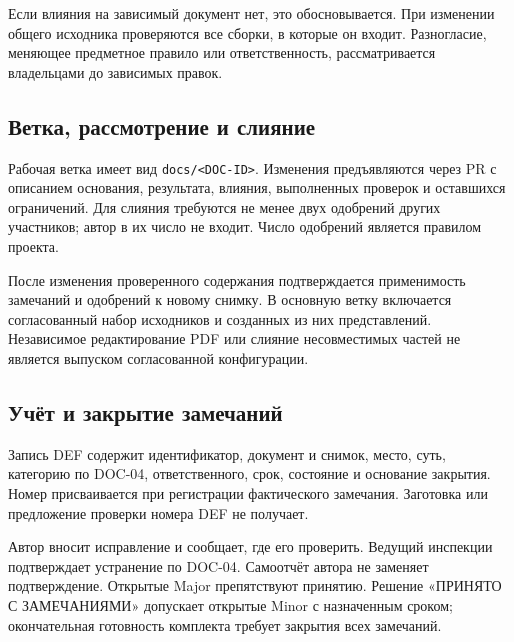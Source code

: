 \documentclass[12pt,a4paper]{article}
\begin{document}
Если влияния на зависимый документ нет, это обосновывается. При изменении общего исходника проверяются все сборки, в которые он входит. Разногласие, меняющее предметное правило или ответственность, рассматривается владельцами до зависимых правок.

\subsection{Ветка, рассмотрение и слияние}\label{ux432ux435ux442ux43aux430-ux440ux430ux441ux441ux43cux43eux442ux440ux435ux43dux438ux435-ux438-ux441ux43bux438ux44fux43dux438ux435}

\hypertarget{ветка-рассмотрение-и-слияние}{}

Рабочая ветка имеет вид \texttt{docs/\allowbreak{}<DOC-\allowbreak{}ID>}. Изменения предъявляются через PR с описанием основания, результата, влияния, выполненных проверок и оставшихся ограничений. Для слияния требуются не менее двух одобрений других участников; автор в их число не входит. Число одобрений является правилом проекта.

После изменения проверенного содержания подтверждается применимость замечаний и одобрений к новому снимку. В основную ветку включается согласованный набор исходников и созданных из них представлений. Независимое редактирование PDF или слияние несовместимых частей не является выпуском согласованной конфигурации.

\subsection{Учёт и закрытие замечаний}\label{ux443ux447ux451ux442-ux438-ux437ux430ux43aux440ux44bux442ux438ux435-ux437ux430ux43cux435ux447ux430ux43dux438ux439}

\hypertarget{учёт-и-закрытие-замечаний}{}

Запись DEF содержит идентификатор, документ и снимок, место, суть, категорию по DOC-04, ответственного, срок, состояние и основание закрытия. Номер присваивается при регистрации фактического замечания. Заготовка или предложение проверки номера DEF не получает.

Автор вносит исправление и сообщает, где его проверить. Ведущий инспекции подтверждает устранение по DOC-04. Самоотчёт автора не заменяет подтверждение. Открытые Major препятствуют принятию. Решение «ПРИНЯТО С ЗАМЕЧАНИЯМИ» допускает открытые Minor с назначенным сроком; окончательная готовность комплекта требует закрытия всех замечаний.
\end{document}
